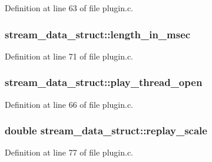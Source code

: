 Definition at line 63 of file plugin.\+c.

\subsubsection[{\texorpdfstring{length\+\_\+in\+\_\+msec}{length_in_msec}}]{ stream\+\_\+data\+\_\+struct\+::length\+\_\+in\+\_\+msec}\hypertarget{structstream__data__struct_a7970cc398a03978690532fa133411c06}{}\label{structstream__data__struct_a7970cc398a03978690532fa133411c06}


Definition at line 71 of file plugin.\+c.

\subsubsection[{\texorpdfstring{play\+\_\+thread\+\_\+open}{play_thread_open}}]{ stream\+\_\+data\+\_\+struct\+::play\+\_\+thread\+\_\+open}\hypertarget{structstream__data__struct_a7162970cc76e24bce7bebf887780d551}{}\label{structstream__data__struct_a7162970cc76e24bce7bebf887780d551}


Definition at line 66 of file plugin.\+c.

\subsubsection[{\texorpdfstring{replay\+\_\+scale}{replay_scale}}]{\setlength{\rightskip}{0pt plus 5cm}double stream\+\_\+data\+\_\+struct\+::replay\+\_\+scale}\hypertarget{structstream__data__struct_a3f1a21ce18c80a1e104989e33f46e322}{}\label{structstream__data__struct_a3f1a21ce18c80a1e104989e33f46e322}


Definition at line 77 of file plugin.\+c.

